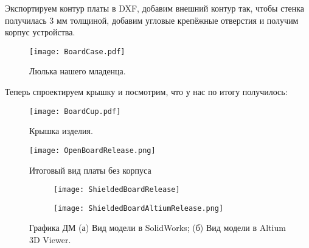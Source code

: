 Экспортируем контур платы в DXF, добавим внешний контур так, чтобы стенка получилась 3 мм толщиной, добавим угловые крепёжные отверстия и получим корпус устройства.

\begin{figure}[H]
	\centering
	\texttt{[image: BoardCase.pdf]}
	\caption{Люлька нашего младенца.}%
	\label{fig:BoardCase}
\end{figure} 

Теперь спроектируем крышку и посмотрим, что у нас по итогу получилось:

\begin{figure}[H]
	\centering
	\texttt{[image: BoardCup.pdf]}
	\caption{Крышка изделия.}%
	\label{fig:BoardCup}
\end{figure} 

\begin{figure}[H]
	\centering
	\texttt{[image: OpenBoardRelease.png]}
	\caption{Итоговый вид платы без корпуса}%
	\label{fig:OpenBoardRelease}
\end{figure} 

\begin{figure}[H]
	\centering
	\begin{subfigure}[b]{0.45\textwidth}
		\centering
		\texttt{[image: ShieldedBoardRelease]}
		\caption{}%
		\label{fig:SolidMech}
	\end{subfigure}
	\hfill
	\begin{subfigure}[b]{0.45\textwidth}
		\centering
		\texttt{[image: ShieldedBoardAltiumRelease.png]}
		\caption{}%
		\label{fig:AltMech}
	\end{subfigure}
	\caption{%
		Графика ДМ
		(а) Вид модели в SolidWorks;
		(б) Вид модели в Altium 3D Viewer.
	}%
	\label{fig:MechanicalRelease}
\end{figure}

